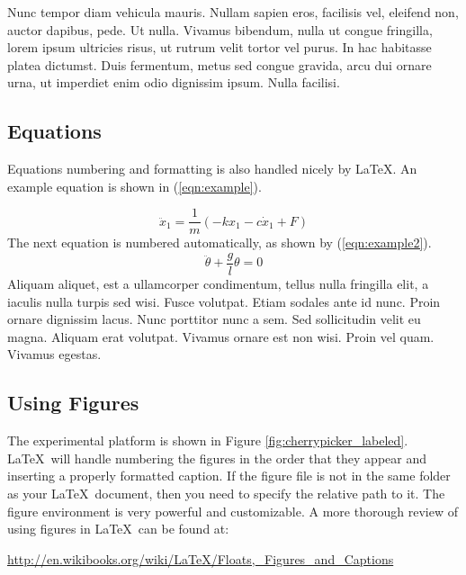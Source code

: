 \documentclass[11pt]{article}
\begin{document}
Nunc tempor diam vehicula mauris. Nullam sapien eros, facilisis vel, eleifend non, auctor dapibus, pede. Ut nulla. Vivamus bibendum, nulla ut congue fringilla, lorem ipsum ultricies risus, ut rutrum velit tortor vel purus. In hac habitasse platea dictumst. Duis fermentum, metus sed congue gravida, arcu dui ornare urna, ut imperdiet enim odio dignissim ipsum. Nulla facilisi. 


\subsection{Equations}
\label{sec:subsection_label}
\vspace{-0.2in}
%
Equations numbering and formatting is also handled nicely by \LaTeX. An example equation is shown in (\ref{eqn:example}).

%
\begin{equation}
\ddot{x}_1 = \frac{1}{m}\left(-k x_1 - c\dot{x}_1 + F\right)
\label{eqn:example}
\end{equation}
%
The next equation is numbered automatically, as shown by (\ref{eqn:example2}).
%
\begin{equation}
\ddot{\theta} + \frac{g}{l}\theta = 0
\label{eqn:example2}
\end{equation}
%
Aliquam aliquet, est a ullamcorper condimentum, tellus nulla fringilla elit, a iaculis nulla turpis sed wisi. Fusce volutpat. Etiam sodales ante id nunc. Proin ornare dignissim lacus. Nunc porttitor nunc a sem. Sed sollicitudin velit eu magna. Aliquam erat volutpat. Vivamus ornare est non wisi. Proin vel quam. Vivamus egestas. 


\subsection{Using Figures}
\label{sec:using_figures}
\vspace{-0.2in}
%
The experimental platform is shown in Figure \ref{fig:cherrypicker_labeled}. \LaTeX\ will handle numbering the figures in the order that they appear and inserting a properly formatted caption. 
If the figure file is not in the same folder as your \LaTeX\ document, then you need to specify the relative path to it. The figure environment is very powerful and customizable. A more thorough review of using figures in \LaTeX\ can be found at: 

\hspace{0.25in}\url{http://en.wikibooks.org/wiki/LaTeX/Floats,_Figures_and_Captions}
%
\end{document}
